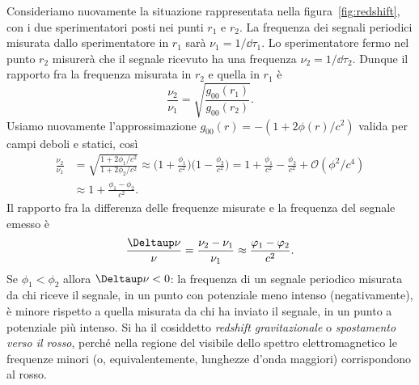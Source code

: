 Consideriamo nuovamente la situazione rappresentata nella
figura~\ref{fig:redshift}, con i due sperimentatori posti nei punti $r_{1}$ e
$r_{2}$.  La frequenza dei segnali periodici misurata dallo sperimentatore in
$r_{1}$ sarà $\nu_{1} = 1/\dd \tau_{1}$.  Lo sperimentatore fermo nel punto
$r_{2}$ misurerà che il segnale ricevuto ha una frequenza
$\nu_{2} = 1/\dd \tau_{2}$.  Dunque il rapporto fra la frequenza misurata in
$r_{2}$ e quella in $r_{1}$ è
\begin{equation}
  \frac{\nu_{2}}{\nu_{1}} = \sqrt{\frac{g_{00}(r_{1})}{g_{00}(r_{2})}}.
\end{equation}
Usiamo nuovamente l'approssimazione $g_{00}(r) = -(1 + 2\phi(r)/c^{2})$ valida
per campi deboli e statici, così
\begin{equation}
  \begin{split}
    \frac{\nu_{2}}{\nu_{1}} &= \sqrt{\frac{1 + 2\phi_{1}/c^{2}}{1 +
        2\phi_{2}/c^{2}}} \approx \bigg(1 + \frac{\phi_{1}}{c^{2}}\bigg) \bigg(1
    - \frac{\phi_{2}}{c^{2}}\bigg) = 1 + \frac{\phi_{1}}{c^{2}} -
    \frac{\phi_{2}}{c^{2}} + \mathcal{O}(\phi^{2}/c^{4}) \\
    &\approx 1 + \frac{\phi_{1} - \phi_{2}}{c^{2}}.
  \end{split}
\end{equation}
Il rapporto fra la differenza delle frequenze misurate e la frequenza del
segnale emesso è
\begin{equation}
  \frac{\var \nu}{\nu} = \frac{\nu_{2} - \nu_{1}}{\nu_{1}} \approx
  \frac{\phi_{1} - \phi_{2}}{c^{2}}.
\end{equation}
Se $\phi_{1} < \phi_{2}$ allora $\var \nu < 0$: la frequenza di un segnale
periodico misurata da chi riceve il segnale, in un punto con potenziale meno
intenso (negativamente), è minore rispetto a quella misurata da chi ha inviato
il segnale, in un punto a potenziale più intenso.  Si ha il cosiddetto
\emph{redshift gravitazionale} o
\emph{spostamento verso il rosso}, perché nella regione del visibile dello
spettro elettromagnetico le frequenze minori (o, equivalentemente, lunghezze
d'onda maggiori) corrispondono al rosso.

